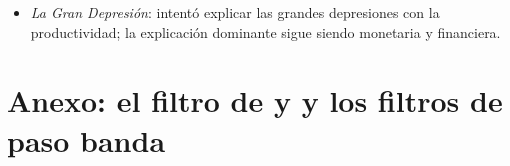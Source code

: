 \documentclass[11pt]{article}
\begin{document}
\begin{itemize}
\begin{itemize}
  \item el \emph{análisis histórico}: en Estados Unidos entre 1867 y 1960, los movimientos del dinero de origen monetario fueron seguidos por movimientos de la producción en el mismo sentido\nocite{FriedmanSchwartz1963Monetary}; \textcite{RomerRomer1989Does} identifican 6~episodios de la posguerra en los que la Reserva Federal decidió provocar una recesión para bajar la inflación (el último, con  en 1979), tras los que el paro sube unos 2~puntos;
  \item los \emph{VAR}, modelos en los que cada variable depende de los valores pasados de todas, con la política medida por el tipo de interés\nocite{Sims1992Interpreting,ChristianoEichenbaumEvans1996Effects}, y su combinación con la identificación narrativa\nocite{RomerRomer2004New}, encuentran efectos reales grandes y rápidos .
  \end{itemize}
\item \emph{La Gran Depresión}:  intentó explicar las grandes depresiones con la productividad\nocite{KehoePrescott2002Great}; la explicación dominante sigue siendo monetaria y financiera\nocite{FriedmanSchwartz1963Monetary,Bernanke1983Nonmonetary}.
\end{itemize}

\section{Anexo: el filtro de  y \cortetitulo{} y los filtros de paso banda}\label{anexo:hp}
\end{document}
